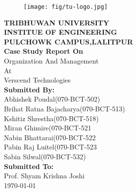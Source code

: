 \begin{titlepage}
\centering
\begin{figure}[h!]
\centering
\texttt{[image: fig/tu-logo.jpg]}
\end{figure}
\vspace{10mm}
{\large\textbf{TRIBHUWAN UNIVERSITY\\
INSTITUE OF ENGINEERING\\
PULCHOWK CAMPUS,LALITPUR\\}}
\vspace{10mm}
\textbf{ Case Study Report On}\\
Organization And Management\\
At\\
Verscend Technologies\\
\vspace{10mm}
\textbf{Submitted By:}\\
Abhishek Poudal(070-BCT-502)\\
Brihat Ratna Bajacharya(070-BCT-513)\\
Kshitiz Shrestha(070-BCT-518)\\
Miran Ghimire(070-BCT-521\\
Nabin Bhattarai(070-BCT-522\\
Pabin Raj Luitel(070-BCT-523\\
Sabin Silwal(070-BCT-532)\\
\vspace{10mm}
\textbf{Submitted To:}\\
Prof. Shyam Krishna Joshi\\
\vspace{10mm}
\vfill
\today
\end{titlepage}
\cleardoublepage
